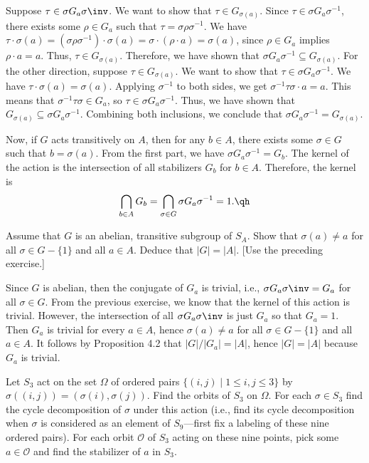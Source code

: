 \begin{sol}
	Suppose $\tau \in \sigma G_a\sigma\inv$. We want to show that $\tau \in G_{\sigma(a)}$. Since $\tau \in \sigma G_a \sigma^{-1}$, there exists some $\rho \in G_a$ such that $\tau = \sigma \rho \sigma^{-1}$. We have $\tau \cdot \sigma(a) = (\sigma \rho \sigma^{-1}) \cdot \sigma(a) = \sigma \cdot (\rho \cdot a) = \sigma(a)$, since $\rho \in G_a$ implies $\rho \cdot a = a$. Thus, $\tau \in G_{\sigma(a)}$. Therefore, we have shown that \(\sigma G_a \sigma^{-1} \subseteq G_{\sigma(a)}\). For the other direction, suppose $\tau \in G_{\sigma(a)}$. We want to show that $\tau \in \sigma G_a \sigma^{-1}$. We have $\tau \cdot \sigma(a) = \sigma(a)$. Applying $\sigma^{-1}$ to both sides, we get $\sigma^{-1} \tau \sigma \cdot a = a$. This means that $\sigma^{-1} \tau \sigma \in G_a$, so $\tau \in \sigma G_a \sigma^{-1}$. Thus, we have shown that \(G_{\sigma(a)} \subseteq \sigma G_a \sigma^{-1}\). Combining both inclusions, we conclude that \(\sigma G_a \sigma^{-1} = G_{\sigma(a)}\).

	Now, if $G$ acts transitively on $A$, then for any $b \in A$, there exists some $\sigma \in G$ such that $b = \sigma(a)$. From the first part, we have \(\sigma G_a \sigma^{-1} = G_b\). The kernel of the action is the intersection of all stabilizers \(G_b\) for \(b \in A\). Therefore, the kernel is
	\[\bigcap_{b \in A} G_b = \bigcap_{\sigma \in G} \sigma G_a \sigma^{-1} = 1. \qh\]
\end{sol}

\begin{exercise}
	Assume that $G$ is an abelian, transitive subgroup of $S_A$. Show that \(\sigma(a) \neq a\) for all \(\sigma \in G - \{1\}\) and all \(a \in A\). Deduce that \(|G| = |A|\). [Use the preceding exercise.]
\end{exercise}

\begin{sol}
	Since $G$ is abelian, then the conjugate of $G_a$ is trivial, i.e., $\sigma G_a \sigma\inv = G_a$ for all $\sigma \in G$. From the previous exercise, we know that the kernel of this action is trivial. However, the intersection of all $\sigma G_a\sigma\inv$ is just $G_a$ so that $G_a = 1$. Then $G_a$ is trivial for every $a \in A$, hence $\sigma(a) \neq a$ for all $\sigma \in G - \{1\}$ and all $a \in A$. It follows by Proposition 4.2 that $|G|/|G_a| = |A|$, hence $|G| = |A|$ because $G_a$ is trivial.
\end{sol}

\begin{exercise}
	Let \(S_3\) act on the set \(\Omega\) of ordered pairs \(\{(i,j) \mid 1 \le i,j \le 3\}\) by \(\sigma((i,j)) = (\sigma(i), \sigma(j))\). Find the orbits of \(S_3\) on \(\Omega\). For each \(\sigma \in S_3\) find the cycle decomposition of \(\sigma\) under this action (i.e., find its cycle decomposition when \(\sigma\) is considered as an element of \(S_9\)—first fix a labeling of these nine ordered pairs). For each orbit \(\mathcal{O}\) of $S_3$ acting on these nine points, pick some \(a \in \mathcal{O}\) and find the stabilizer of \(a\) in \(S_3\).
\end{exercise}

